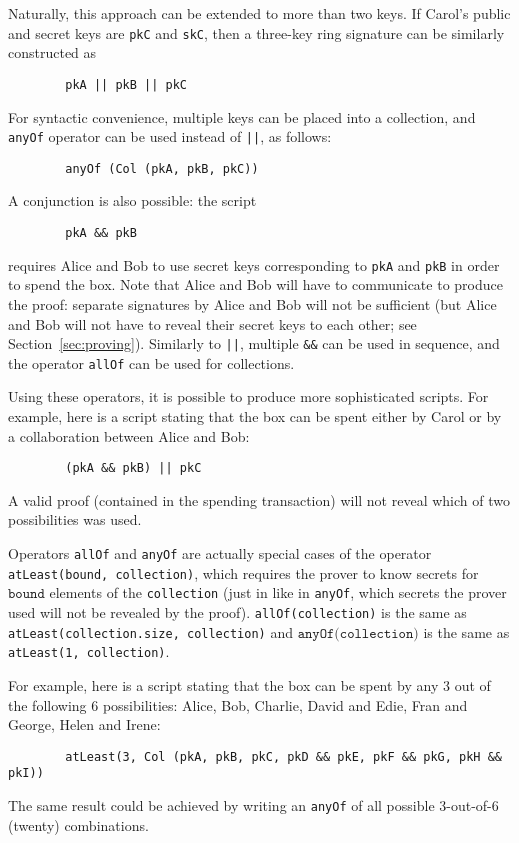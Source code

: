 \documentclass[11pt]{article}
\begin{document}
Naturally, this approach can be extended to more than two keys. If Carol's public and secret keys are \texttt{pkC} and \texttt{skC}, then a three-key ring signature can be similarly constructed as
\begin{verbatim}
        pkA || pkB || pkC
\end{verbatim}
	
For syntactic convenience, multiple keys can be placed into a collection, and \texttt{anyOf} operator can be used instead of \texttt{||}, as follows:
\begin{verbatim}
        anyOf (Col (pkA, pkB, pkC))
\end{verbatim}

A conjunction is also possible: the script
\begin{verbatim}
        pkA && pkB
\end{verbatim}
requires Alice and Bob to use secret keys corresponding to \texttt{pkA} and \texttt{pkB} in order to spend the box. Note that Alice and Bob will have to communicate to produce the proof: separate signatures by Alice and Bob will not be sufficient (but Alice and Bob will not have to reveal their secret keys to each other; see Section~\ref{sec:proving}). Similarly to \texttt{||}, multiple \texttt{\&\&} can be used in sequence, and the operator \texttt{allOf} can be used for collections.


Using these operators, it is possible to produce more sophisticated scripts. For example, here is a script stating that the box can be spent either by Carol or by a collaboration between Alice and Bob:

\begin{verbatim}
        (pkA && pkB) || pkC
\end{verbatim}


A valid proof (contained in the spending transaction) will not reveal which of two possibilities was used.

Operators \texttt{allOf} and \texttt{anyOf} are actually special cases of the operator \texttt{atLeast(bound, collection)}, which requires the prover to know secrets for $\texttt{bound}$ elements of the \texttt{collection} (just in like in \texttt{anyOf}, which secrets the prover used will not be revealed by the proof). \texttt{allOf(collection)} is the same as \texttt{atLeast(collection.size, collection)} and $\texttt{anyOf(collection)}$ is the same as \texttt{atLeast(1, collection)}.

For example, here is a script stating that the box can be spent by any 3 out of the following 6 possibilities: Alice, Bob, Charlie, David and Edie, Fran and George, Helen and Irene:
\begin{verbatim}
        atLeast(3, Col (pkA, pkB, pkC, pkD && pkE, pkF && pkG, pkH && pkI))
\end{verbatim}
The same result could be achieved by writing an \texttt{anyOf} of all possible 3-out-of-6 (twenty) combinations.
\end{document}
